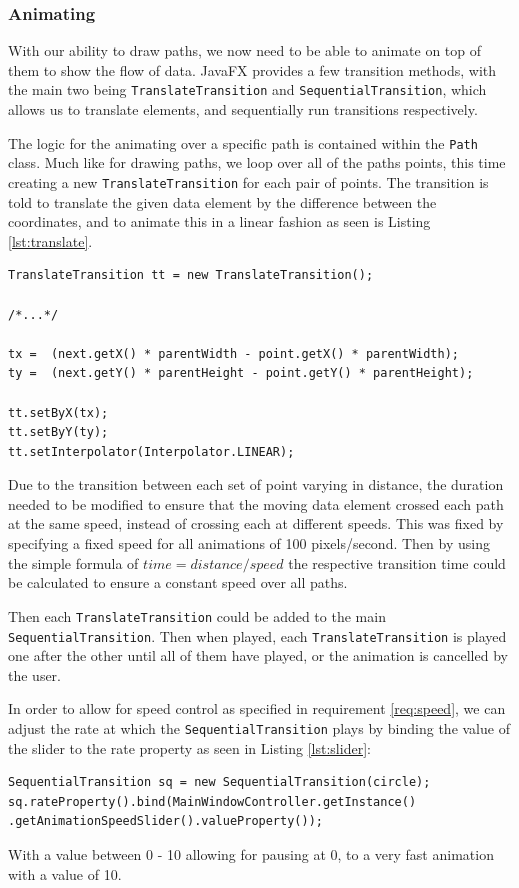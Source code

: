 \subsubsection{Animating}
With our ability to draw paths, we now need to be able to animate on top of them to show the flow of data. JavaFX \cite{sunmicrosystems_2022_javafx} provides a few transition methods, with the main two being \texttt{TranslateTransition} and \texttt{SequentialTransition}, which allows us to translate elements, and sequentially run transitions respectively.

The logic for the animating over a specific path is contained within the \texttt{Path} class. Much like for drawing paths, we loop over all of the paths points, this time creating a new \texttt{TranslateTransition} for each pair of points. The transition is told to translate the given data element by the difference between the coordinates, and to animate this in a linear fashion as seen is Listing \ref{lst:translate}.

\begin{lstlisting}[caption=Translate Transition for two points, label=lst:translate]
TranslateTransition tt = new TranslateTransition();

/*...*/

tx =  (next.getX() * parentWidth - point.getX() * parentWidth);
ty =  (next.getY() * parentHeight - point.getY() * parentHeight);

tt.setByX(tx);
tt.setByY(ty);
tt.setInterpolator(Interpolator.LINEAR);
\end{lstlisting}

Due to the transition between each set of point varying in distance, the duration needed to be modified to ensure that the moving data element crossed each path at the same speed, instead of crossing each at different speeds. This was fixed by specifying a fixed speed for all animations of 100 pixels/second. Then by using the simple formula of $time = distance/speed$ the respective transition time could be calculated to ensure a constant speed over all paths.

Then each \texttt{TranslateTransition} could be added to the main \texttt{SequentialTransition}. Then when played, each \texttt{TranslateTransition} is played one after the other until all of them have played, or the animation is cancelled by the user.

In order to allow for speed control as specified in requirement \ref{req:speed}, we can adjust the rate at which the \texttt{SequentialTransition} plays by binding the value of the slider to the rate property as seen in Listing \ref{lst:slider}:
\begin{lstlisting}[caption=Slider linking code, label=lst:slider]
SequentialTransition sq = new SequentialTransition(circle);
sq.rateProperty().bind(MainWindowController.getInstance() .getAnimationSpeedSlider().valueProperty());
\end{lstlisting}
With a value between 0 - 10 allowing for pausing at 0, to a very fast animation with a value of 10.

